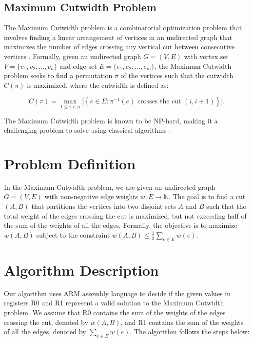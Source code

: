 \subsection{Maximum Cutwidth Problem}
\label{subsec:max_cutwidth}

The Maximum Cutwidth problem is a combinatorial optimization problem that involves finding a linear arrangement of vertices in an undirected graph that maximizes the number of edges crossing any vertical cut between consecutive vertices \cite{garey_johnson_1979}. Formally, given an undirected graph $G = (V, E)$ with vertex set $V = \{v_1, v_2, \dots, v_n\}$ and edge set $E = \{e_1, e_2, \dots, e_m\}$, the Maximum Cutwidth problem seeks to find a permutation $\pi$ of the vertices such that the cutwidth $C(\pi)$ is maximized, where the cutwidth is defined as:

\begin{equation}
C(\pi) = \max_{1 \leq i < n} \left| \left\{ e \in E : \pi^{-1}(e) \text{ crosses the cut } (i, i+1) \right\} \right|.
\end{equation}

The Maximum Cutwidth problem is known to be NP-hard, making it a challenging problem to solve using classical algorithms \cite{karp1972reducibility}.

\section{Problem Definition}

In the Maximum Cutwidth problem, we are given an undirected graph $G = (V, E)$ with non-negative edge weights $w : E \rightarrow \mathbb{N}$. The goal is to find a cut $(A, B)$ that partitions the vertices into two disjoint sets $A$ and $B$ such that the total weight of the edges crossing the cut is maximized, but not exceeding half of the sum of the weights of all the edges. Formally, the objective is to maximize $w(A, B)$ subject to the constraint $w(A, B) \leq \frac{1}{2} \sum_{e \in E} w(e)$.

\section{Algorithm Description}

Our algorithm uses ARM assembly language to decide if the given values in registers R0 and R1 represent a valid solution to the Maximum Cutwidth problem. We assume that R0 contains the sum of the weights of the edges crossing the cut, denoted by $w(A, B)$, and R1 contains the sum of the weights of all the edges, denoted by $\sum_{e \in E} w(e)$. The algorithm follows the steps below:

